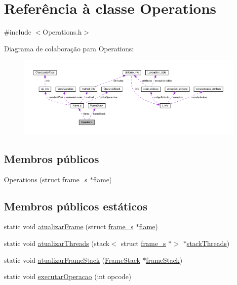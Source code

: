 \hypertarget{classOperations}{}\section{Referência à classe Operations}
\label{classOperations}


{\ttfamily \#include $<$Operations.\+h$>$}



Diagrama de colaboração para Operations\+:
\nopagebreak
\begin{figure}[H]
\begin{center}
\leavevmode
\includegraphics[width=350pt]{classOperations__coll__graph}
\end{center}
\end{figure}
\subsection*{Membros públicos}
\begin{DoxyCompactItemize}
\item 
\hyperlink{classOperations_af4742b57ed46ed1d0bc96629cdf219b2}{Operations} (struct \hyperlink{structframe__s}{frame\+\_\+s} $\ast$\hyperlink{classOperations_a578012ad7aafe27db149c6e421bef1a6}{flame})
\end{DoxyCompactItemize}
\subsection*{Membros públicos estáticos}
\begin{DoxyCompactItemize}
\item 
static void \hyperlink{classOperations_a4a846f964056932fdf4d63056bfbe322}{atualizar\+Frame} (struct \hyperlink{structframe__s}{frame\+\_\+s} $\ast$\hyperlink{classOperations_a578012ad7aafe27db149c6e421bef1a6}{flame})
\item 
static void \hyperlink{classOperations_a6c265501b41e227e1a15589a0bb03166}{atualizar\+Threads} (stack$<$ struct \hyperlink{structframe__s}{frame\+\_\+s} $\ast$$>$ $\ast$\hyperlink{classOperations_af0867c8994e496c70f9c3157eeb8a287}{stack\+Threads})
\item 
static void \hyperlink{classOperations_a96812e295c8429a32e09720d89cd0176}{atualizar\+Frame\+Stack} (\hyperlink{classFrameStack}{Frame\+Stack} $\ast$\hyperlink{classOperations_a72ff498d126bb8082b3ac70ccb6e953a}{frame\+Stack})
\item 
static void \hyperlink{classOperations_ab63307824c7d6412e0afb1d037b995f1}{executar\+Operacao} (int opcode)
\end{DoxyCompactItemize}

